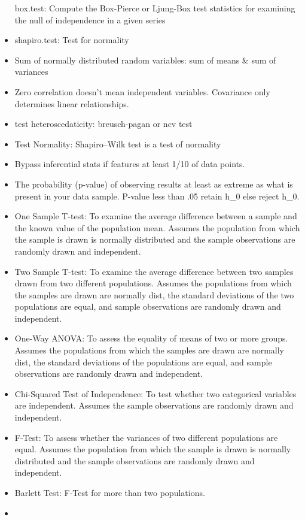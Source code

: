 \documentclass[]{book}
\begin{document}
\begin{itemize}
  box.test: Compute the Box-Pierce or Ljung-Box test statistics for
  examining the null of independence in a given series
\item
  shapiro.test: Test for normality
\item
  Sum of normally distributed random variables: sum of means \& sum of
  variances
\item
  Zero correlation doesn't mean independent variables. Covariance only
  determines linear relationships.
\item
  test heteroscedaticity: breusch-pagan or ncv test
\item
  Test Normality: Shapiro--Wilk test is a test of normality
\item
  Bypass inferential stats if features at least 1/10 of data points.
\item
  The probability (p-value) of observing results at least as extreme as
  what is present in your data sample. P-value less than .05 retain h\_0
  else reject h\_0.
\item
  One Sample T-test: To examine the average difference between a sample
  and the known value of the population mean. Assumes the population
  from which the sample is drawn is normally distributed and the sample
  observations are randomly drawn and independent.
\item
  Two Sample T-test: To examine the average difference between two
  samples drawn from two different populations. Assumes the populations
  from which the samples are drawn are normally dist, the standard
  deviations of the two populations are equal, and sample observations
  are randomly drawn and independent.
\item
  One-Way ANOVA: To assess the equality of means of two or more groups.
  Assumes the populations from which the samples are drawn are normally
  dist, the standard deviations of the populations are equal, and sample
  observations are randomly drawn and independent.
\item
  Chi-Squared Test of Independence: To test whether two categorical
  variables are independent. Assumes the sample observations are
  randomly drawn and independent.
\item
  F-Test: To assess whether the variances of two different populations
  are equal. Assumes the population from which the sample is drawn is
  normally distributed and the sample observations are randomly drawn
  and independent.
\item
  Barlett Test: F-Test for more than two populations.
\item

\end{itemize}
\end{document}
